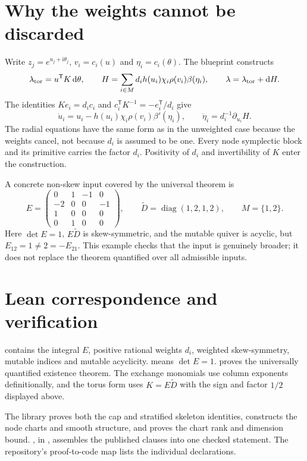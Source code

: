 \section{Why the weights cannot be discarded}
Write $z_j=e^{u_j+\mathrm i\theta_j}$, $v_i=c_i(u)$ and
$\eta_i=c_i(\theta)$. The blueprint constructs
\[
 \lambda_{\rm tor}=u^{\mathsf T}K\,\mathrm d\theta,\qquad
 H=\sum_{i\in M}d_i h(u_i)\chi_i\rho(v_i)\beta(\eta_i),\qquad
 \lambda=\lambda_{\rm tor}+\mathrm d H.
\]
The identities $Ke_i=d_ic_i$ and
$c_i^{\mathsf T}K^{-1}=-e_i^{\mathsf T}/d_i$ give
\[
 \dot u_i=u_i-h(u_i)\chi_i\rho(v_i)\beta'(\eta_i),\qquad
 \dot\eta_i=d_i^{-1}\partial_{u_i}H.
\]
The radial equations have the same form as in the unweighted case
because the weights cancel, not because $d_i$ is assumed to be one.
Every node symplectic block and its primitive carries the factor $d_i$.
Positivity of $d_i$ and invertibility of $K$ enter the construction.

A concrete non-skew input covered by the universal theorem is
\[
 E=\begin{pmatrix}
 0&1&-1&0\\-2&0&0&-1\\1&0&0&0\\0&1&0&0
 \end{pmatrix},\qquad
 \widetilde D=\operatorname{diag}(1,2,1,2),\qquad M=\{1,2\}.
\]
Here $\det E=1$, $E\widetilde D$ is skew-symmetric, and the mutable
quiver is acyclic, but $E_{12}=1\ne2=-E_{21}$. This example checks
that the input is genuinely broader; it does not replace the theorem
quantified over all admissible inputs.

\section{Lean correspondence and verification}
 contains the integral $E$, positive rational weights $d_i$,
weighted skew-symmetry, mutable indices and mutable acyclicity.
 means $\det E=1$.
 proves the universally quantified
existence theorem. The exchange monomials use column exponents
definitionally, and the torus form uses $K=E\widetilde D$ with the sign
and factor $1/2$ displayed above.

The library proves both the cap and stratified skeleton identities,
constructs the node charts and smooth structure, and proves the chart
rank and dimension bound.
, in
, assembles the published
clauses into one checked statement. The repository's proof-to-code map
lists the individual declarations.


